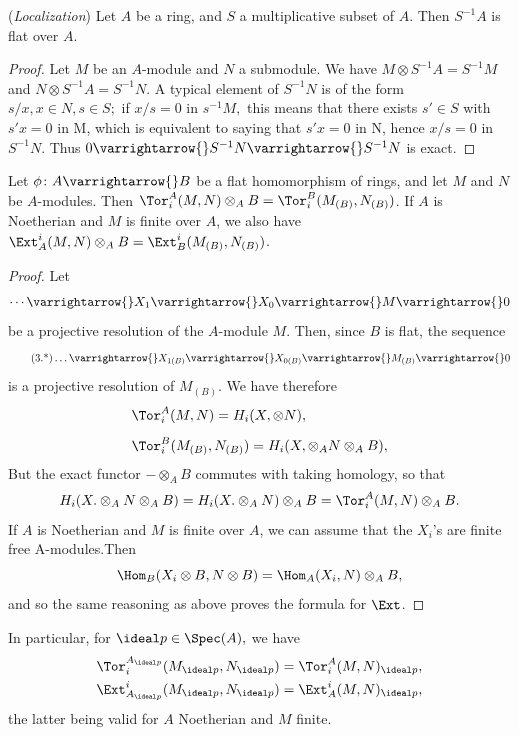 \documentclass[../main]{subfiles}
\begin{document}
\newparagraph (\emph{Localization}) Let $A$ be a ring, and $S$ a multiplicative subset of $A$. Then $S^{-1}A$ is flat over $A$. 

\begin{proof} 
    Let $M$ be an $A$-module and $N$ a submodule. We have $M \otimes S^{-1}A = S^{-1}M$ and $N \otimes S^{-1}A = S^{-1}N.$ A typical element of $S^{-1}N$ is of the form $s/ x, x\in N, s \in S;$ if $x/ s = 0$ in $s^{-1}M,$ this means that there exists $s' \in S$ with $s'x = 0 $ in M, which is equivalent to saying that $s'x = 0$ in N, hence $x/ s =0$ in $S^{-1}N.$ Thus $0 \varrightarrow{} S^{-1}N \varrightarrow{} S^{-1}N$ is exact.
\end{proof}

\newparagraph Let $\phi\colon A \varrightarrow{} B  $ be a flat homomorphism of rings, and let $M$ and $N$ be $A$-modules. Then $\Tor_i^A(M,N) \otimes_A B = \Tor_i^B (M_{(B)}, N_{(B)}) $. If $A$ is Noetherian and $M$ is finite over $A$, we also have $\Ext_A^i(M,N) \otimes_AB = \Ext_B^i(M_{(B)}, N_{(B)}) $. 


\begin{proof} 
    Let \[\cdots \varrightarrow{} X_1 \varrightarrow{} X_0 \varrightarrow{} M \varrightarrow{} 0\] be a projective resolution of the $A$-module $M$. Then, since $B$ is flat, the sequence
     \[\tag{3.*}\label{eqn:3.*}
        \ldots \varrightarrow{} X_{1(B)} \varrightarrow{} X_{0(B)} \varrightarrow{} M_{(B)} \varrightarrow{} 0
    \]
    is a projective resolution of $M_{(B)}$. We have therefore 
    \begin{align*}
        &\Tor_i^A(M,N) = H_i(X,\otimes N),\\[0.5em]
        &\Tor_i^B(M_{(B)}, N_{(B)}) = H_i(X, \otimes_A N \otimes_A B),
    \end{align*}
    But the exact functor $-\otimes_AB$ commutes with taking homology, so that 
    \[
        H_i(X.\otimes_AN\otimes_A B) = H_i(X.\otimes_AN)\otimes_A B = \Tor_i^A (M,N) \otimes_AB.
    \] 
    If $A$ is Noetherian and $M$ is finite over $A$, we can assume that the $X_i$'s are finite free A-modules.Then \[\Hom_B(X_i\otimes B, N \otimes B) = \Hom_A(X_i, N) \otimes_A B,\] and so the same reasoning as above proves the formula for $\Ext$. 
\end{proof}
In particular, for $\ideal p \in \Spec(A),$ we have 
\begin{align*}
    &\Tor_i^{A_{\ideal p}} (M_{\ideal p}, N_{\ideal p}) = \Tor_i^A (M,N)_{\ideal p}, \\
    &\Ext^i_{A_{\ideal p}} (M_{\ideal p}, N_{\ideal p}) =\Ext^i_A (M,N)_{\ideal p}, 
\end{align*}
the latter being valid for $A$ Noetherian and $M$ finite.
\end{document}
